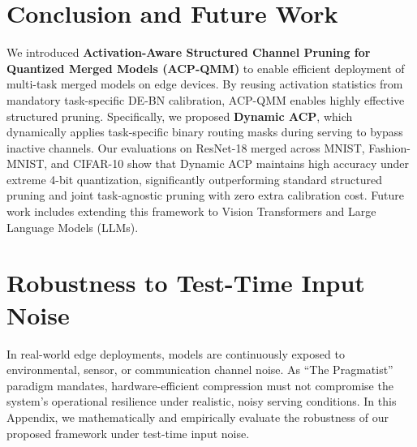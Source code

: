 \documentclass{article}
\theoremstyle{plain}
\theoremstyle{definition}
\theoremstyle{remark}
\begin{document}
\section{Conclusion and Future Work}
\label{sec:conclusion}
We introduced \textbf{Activation-Aware Structured Channel Pruning for Quantized Merged Models (ACP-QMM)} to enable efficient deployment of multi-task merged models on edge devices. By reusing activation statistics from mandatory task-specific DE-BN calibration, ACP-QMM enables highly effective structured pruning. Specifically, we proposed \textbf{Dynamic ACP}, which dynamically applies task-specific binary routing masks during serving to bypass inactive channels. Our evaluations on ResNet-18 merged across MNIST, Fashion-MNIST, and CIFAR-10 show that Dynamic ACP maintains high accuracy under extreme 4-bit quantization, significantly outperforming standard structured pruning and joint task-agnostic pruning with zero extra calibration cost. Future work includes extending this framework to Vision Transformers and Large Language Models (LLMs).

\nocite{*}



\newpage
\appendix
\onecolumn
\section{Robustness to Test-Time Input Noise}
\label{sec:appendix_noise}

In real-world edge deployments, models are continuously exposed to environmental, sensor, or communication channel noise. As ``The Pragmatist'' paradigm mandates, hardware-efficient compression must not compromise the system's operational resilience under realistic, noisy serving conditions. In this Appendix, we mathematically and empirically evaluate the robustness of our proposed framework under test-time input noise.
\end{document}
